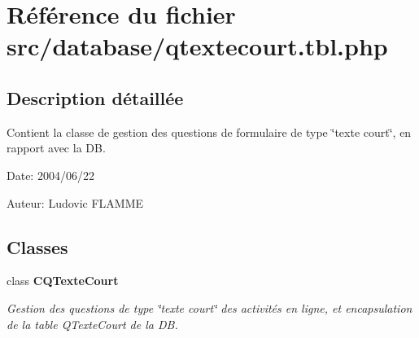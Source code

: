 \section{Référence du fichier src/database/qtextecourt.tbl.php}
\label{qtextecourt_8tbl_8php}


\subsection{Description détaillée}
Contient la classe de gestion des questions de formulaire de type \char`\"{}texte court\char`\"{}, en rapport avec la DB. 

\begin{Desc}
\item[Date:]2004/06/22\end{Desc}
\begin{Desc}
\item[Auteur:]Ludovic FLAMME \end{Desc}


\subsection*{Classes}
\begin{CompactItemize}
\item 
class {\bf CQTexteCourt}
\begin{CompactList}\small\item\em Gestion des questions de type \char`\"{}texte court\char`\"{} des activités en ligne, et encapsulation de la table QTexteCourt de la DB. \item\end{CompactList}\end{CompactItemize}
